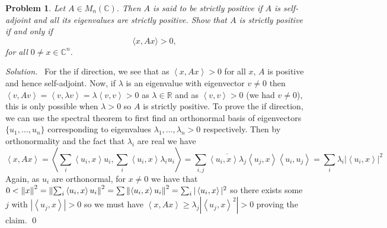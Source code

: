 \documentclass[12pt,a4paper]{article}
\newenvironment{solution}{%
  \par\noindent\textit{Solution.}\ }{\qed}
\theoremstyle{problemstyle}
\newtheorem{problem}{Problem}[section]
\def\bR{\mathbb{R}}
\newcommand{\ipp}[1]{\left\langle#1\right\rangle}
\begin{document}
\begin{problem}\label{prob:4-10}
Let $A \in M_n(\mathbb{C})$. Then $A$ is said to be \emph{strictly positive} if $A$ is self-adjoint and all its eigenvalues are strictly positive. Show that $A$ is strictly positive if and only if
\[
\langle x, Ax \rangle > 0,
\]
for all $0 \neq x \in \mathbb{C}^n$.
\end{problem}
\begin{solution}
	For the if direction, we see that as $\ipp{x,Ax}>0$ for all $x$, $A$ is positive and hence self-adjoint. 
	Now, if $\lambda$ is an eigenvalue with eigenvector $v\neq 0$ then $\ipp{v,Av}=\ipp{v,\lambda v}=\lambda\ipp{v,v}>0$ as $\lambda\in\bR$ and as $\ipp{v,v}>0$ (we had $v\neq 0$), this is only possible when $\lambda>0$ so $A$ is strictly positive. 
	To prove the if direction, we can use the spectral theorem to first find an orthonormal basis of eigenvectors $\{u_1,\ldots,u_n\}$ corresponding to eigenvalues $\lambda_1,\ldots,\lambda_n>0$ respectively. 
	Then by orthonormality and the fact that $\lambda_i$ are real we have 
	\[
		\ipp{x,Ax}=\ipp{\sum_i\ipp{u_i,x}u_i,\sum_i\ipp{u_i,x}\lambda_iu_i}=\sum_{i,j}\overline{\ipp{u_i,x}\lambda_j}\ipp{u_j,x}\ipp{u_i,u_j}=\sum_i\lambda_i|\ipp{u_i,x}|^2
	\]
	Again, as $u_i$ are orthonormal, for $x\neq 0$ we have that $0<\norm{x}^2=\norm{\sum_i\ipp{u_i,x}u_i}^2=\sum\norm{\ipp{u_i,x}u_i}^2=\sum_i|\ipp{u_i,x}|^2$ so there exists some $j$ with $|\ipp{u_j,x}|>0$ so we must have $\ipp{x,Ax}\geq\lambda_j|\ipp{u_j,x}^2|>0$ proving the claim.
\end{solution}
\end{document}
